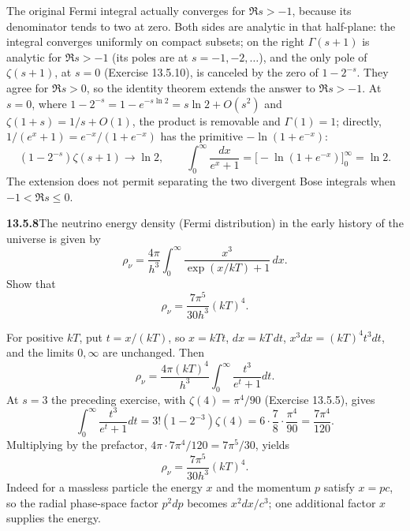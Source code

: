 The original Fermi integral actually converges for $\Re s>-1$,
because its denominator tends to two at zero.  Both sides are
analytic in that half-plane: the integral converges uniformly on
compact subsets; on the right $\Gamma(s+1)$ is analytic for
$\Re s>-1$ (its poles are at $s=-1,-2,\ldots$), and the only pole
of $\zeta(s+1)$, at $s=0$ (Exercise 13.5.10), is canceled by the
zero of $1-2^{-s}$.  They agree for $\Re s>0$, so the identity theorem
extends the answer to $\Re s>-1$.  At $s=0$, where
$1-2^{-s}=1-e^{-s\ln2}=s\ln2+O(s^2)$ and
$\zeta(1+s)=1/s+O(1)$, the product is removable and $\Gamma(1)=1$;
directly, $1/(e^x+1)=e^{-x}/(1+e^{-x})$ has the primitive
$-\ln(1+e^{-x})$:
\[
(1-2^{-s})\zeta(s+1)\longrightarrow\ln2,
\qquad
\int_0^\infty\frac{dx}{e^x+1}
=\bigl[-\ln(1+e^{-x})\bigr]_0^\infty=\ln2.
\]
The extension does not permit separating the two divergent
Bose integrals when $-1<\Re s\le0$.


\par\bigskip
\noindent\textbf{13.5.8}\quad The neutrino energy density (Fermi
distribution) in the early history of the universe is given by
\[
\rho_{\nu}=\frac{4\pi}{h^{3}}
\int_{0}^{\infty}\frac{x^{3}}{\exp(x/kT)+1}\,dx.
\]
Show that
\[
\rho_{\nu}=\frac{7\pi^{5}}{30h^{3}}(kT)^{4}.
\]
\par\smallskip
{}
\solution
For positive $kT$, put $t=x/(kT)$, so $x=kTt$, $dx=kT\,dt$,
$x^3dx=(kT)^4t^3dt$, and the limits $0,\infty$ are unchanged.  Then
\[
\rho_\nu=\frac{4\pi(kT)^4}{h^3}
\int_0^\infty\frac{t^3}{e^t+1}dt.
\]
At $s=3$ the preceding exercise, with $\zeta(4)=\pi^4/90$
(Exercise 13.5.5), gives
\[
\int_0^\infty\frac{t^3}{e^t+1}dt
=3!(1-2^{-3})\zeta(4)
=6\cdot\frac78\cdot\frac{\pi^4}{90}
=\frac{7\pi^4}{120}.
\]
Multiplying by the prefactor, $4\pi\cdot7\pi^4/120=7\pi^5/30$, yields
\[
\boxed{\rho_\nu=\frac{7\pi^5}{30h^3}(kT)^4}.
\]
  Indeed for a massless particle the energy $x$ and the
momentum $p$ satisfy $x=pc$, so the
radial phase-space factor $p^2dp$ becomes $x^2dx/c^3$; one
additional factor $x$ supplies the energy.


